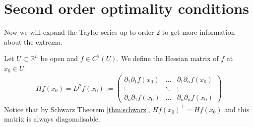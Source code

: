 \newpage
\section{Second order optimality conditions}

Now we will expand the Taylor series up to order $2$ to get more information about the extrema.

\begin{definition}\label{def:hessian-matrix}
	Let $U \subset \mathbb{R}^{n}$ be open and $f \in C^{2}(U)$. We define the Hessian matrix of $f$ at $x_{0} \in U$
	\begin{align*}
		Hf(x_{0}) = D^{2} f(x_{0}) :=
		\begin{pmatrix}
			\partial_{1} \partial_{1} f(x_{0}) & \dots  & \partial_{1} \partial_{n} f(x_{0}) \\
			\vdots                             & \ddots & \vdots                             \\
			\partial_{n} \partial_{1} f(x_{0}) & \dots  & \partial_{n} \partial_{n} f(x_{0})
		\end{pmatrix}
	\end{align*}
	Notice that by Schwarz Theorem \ref{thm:schwarz}, $Hf(x_{0})^\top  = Hf(x_{0})$ and this matrix is always diagonalisable.
\end{definition}

